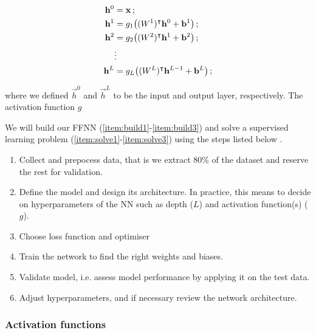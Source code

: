     \begin{subequations}
        \begin{align} 
            \vec{h}^0 &= \vec{x}\,; \\%
            \vec{h}^1 &= g_1 \big((W^1)\TT \vec{h}^0 + \vec{b}^1\big)\,; \\
            \vec{h}^2 &= g_2 \big( (W^2)\TT \vec{h}^1 + \vec{b}^2\big)\,; \\
            &\vdots \nonumber \\
            \vec{h}^{L} &= g_L \big((W^{L})\TT \vec{h}^{L-1} + \vec{b}^L\big)\,;             
        \end{align}
    \end{subequations}

    where we defined $\vec{h}^0$ and $\vec{h}^L$ to be the input and output layer, respectively. The activation function $g$ \fillertext

    We will build our FFNN (\ref{item:build1}-\ref{item:build3}) and solve a supervised learning problem (\ref{item:solve1}-\ref{item:solve3}) using the steps listed below \citep{mhjensen}.

    \begin{enumerate}[label=(\roman*)]
        \item\label{item:build1} Collect and prepocess data, that is we extract 80\% of the dataset and reserve the rest for validation. 
        \item\label{item:build2} Define the model and design its architecture. In practice, this means to decide on hyperparameters of the NN such as depth ($L$) and activation function(s) ($g$).
        \item\label{item:build3} Choose loss function and optimiser 
        \item\label{item:solve1} Train the network to find the right weights and biases.
        \item\label{item:solve2} Validate model, i.e. assess model performance by applying it on the test data.
        \item\label{item:solve3} Adjust hyperparameters, and if necessary review the network architecture.
    \end{enumerate}



    \subsubsection{Activation functions}\label{sec:activation_function}

